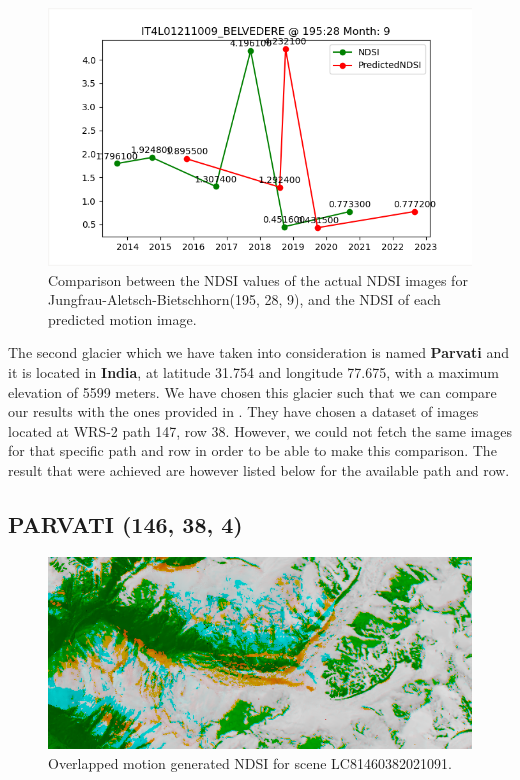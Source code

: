 \documentclass[12pt, a4paper]{report}
\begin{document}
	\begin{figure}[h!]
		\centering
		\includegraphics[scale=0.5]{../images/experiment_195289.png}
		\caption{Comparison between the NDSI values of the actual NDSI images for Jungfrau-Aletsch-Bietschhorn(195, 28, 9), and the NDSI of each predicted motion image.}
		\label{fig:jungfrau_195289}
	\end{figure}
	
	\vfill
	\newpage{}
	
	\par The second glacier which we have taken into consideration is named \textbf{Parvati} and it is located in \textbf{India}, at latitude 31.754 and longitude 77.675, with a maximum elevation of 5599 meters. We have chosen this glacier such that we can compare our results with the ones provided in \cite{parvati}. They have chosen a dataset of images located at WRS-2 path 147, row 38. However, we could not fetch the same images for that specific path and row in order to be able to make this comparison. The result that were achieved are however listed below for the available path and row.
	
	\subsection{PARVATI (146, 38, 4)}
		
	\begin{figure}[h!]
		\centering
		\includegraphics[width=\linewidth]{../images/experiment_1460384_image.png}
		\caption{Overlapped motion generated NDSI for scene LC81460382021091.}
		\label{fig:experiment_1460384_image}
	\end{figure}
\end{document}

